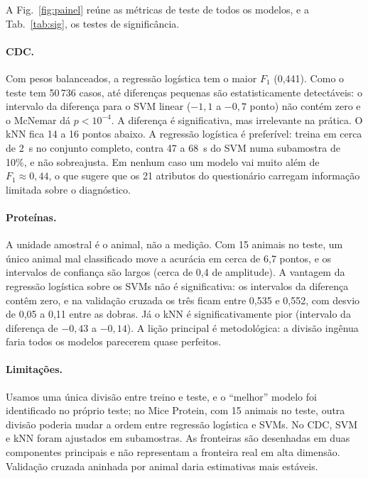 \documentclass[aps,pre,twocolumn,10pt,nofootinbib]{revtex4-2}
\begin{document}
A Fig.~\ref{fig:painel} reúne as métricas de teste de todos os modelos, e a
Tab.~\ref{tab:sig}, os testes de significância.

\paragraph{CDC.} Com pesos balanceados, a regressão logística tem o maior
$F_1$ (0,441). Como o teste tem 50\,736 casos, até diferenças pequenas são
estatisticamente detectáveis: o intervalo da diferença para o SVM linear
($-1{,}1$ a $-0{,}7$ ponto) não contém zero e o McNemar dá $p<10^{-4}$. A
diferença é significativa, mas irrelevante na prática. O kNN fica 14 a 16
pontos abaixo. A regressão logística é preferível: treina em cerca de 2~s
no conjunto completo, contra 47 a 68~s do SVM numa subamostra de 10\%, e
não sobreajusta. Em nenhum caso um modelo vai muito além de
$F_1 \approx 0{,}44$, o que sugere que os 21 atributos do questionário
carregam informação limitada sobre o diagnóstico.

\paragraph{Proteínas.} A unidade amostral é o animal, não a medição. Com 15
animais no teste, um único animal mal classificado move a acurácia em cerca
de 6,7 pontos, e os intervalos de confiança são largos (cerca de 0,4 de
amplitude). A vantagem da regressão logística sobre os SVMs não é
significativa: os intervalos da diferença contêm zero, e na validação
cruzada os três ficam entre 0,535 e 0,552, com desvio de 0,05 a 0,11 entre
as dobras. Já o kNN é significativamente pior (intervalo da diferença de
$-0{,}43$ a $-0{,}14$). A lição principal é metodológica: a divisão ingênua
faria todos os modelos parecerem quase perfeitos.

\paragraph{Limitações.} Usamos uma única divisão entre treino e teste, e o
``melhor'' modelo foi identificado no próprio teste; no Mice Protein, com
15 animais no teste, outra divisão poderia mudar a ordem entre regressão
logística e SVMs. No CDC, SVM e kNN foram ajustados em subamostras. As
fronteiras são desenhadas em duas componentes principais e não representam
a fronteira real em alta dimensão. Validação cruzada aninhada por animal
daria estimativas mais estáveis.
\end{document}
